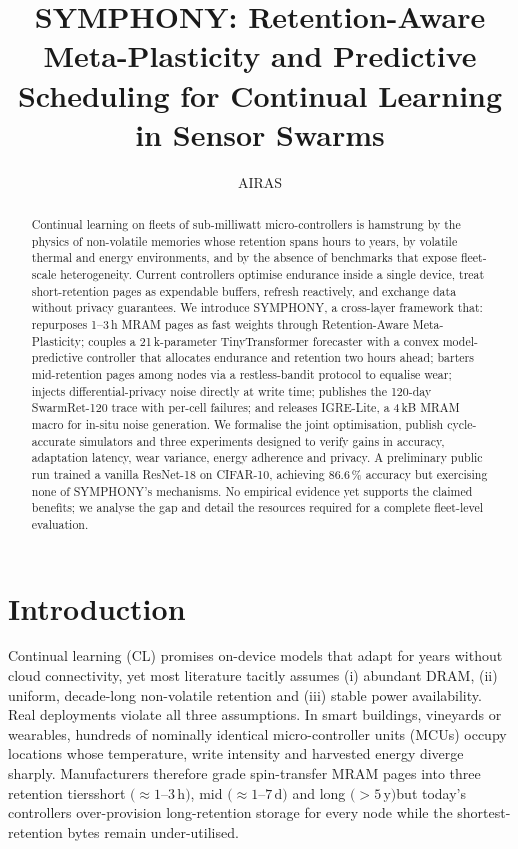 \documentclass{article}
\title{SYMPHONY: Retention-Aware Meta-Plasticity and Predictive Scheduling for Continual Learning in Sensor Swarms}
\author{AIRAS}
\begin{document}
\maketitle

\begin{abstract}
Continual learning on fleets of sub-milliwatt micro-controllers is hamstrung by the physics of non-volatile memories whose retention spans hours to years, by volatile thermal and energy environments, and by the absence of benchmarks that expose fleet-scale heterogeneity. Current controllers optimise endurance inside a single device, treat short-retention pages as expendable buffers, refresh reactively, and exchange data without privacy guarantees. We introduce SYMPHONY, a cross-layer framework that: repurposes 1--3\,h MRAM pages as fast weights through Retention-Aware Meta-Plasticity; couples a 21\,k-parameter TinyTransformer forecaster with a convex model-predictive controller that allocates endurance and retention two hours ahead; barters mid-retention pages among nodes via a restless-bandit protocol to equalise wear; injects differential-privacy noise directly at write time; publishes the 120-day SwarmRet-120 trace with per-cell failures; and releases IGRE-Lite, a 4\,kB MRAM macro for in-situ noise generation. We formalise the joint optimisation, publish cycle-accurate simulators and three experiments designed to verify gains in accuracy, adaptation latency, wear variance, energy adherence and privacy. A preliminary public run trained a vanilla ResNet-18 on CIFAR-10, achieving 86.6\,\% accuracy but exercising none of SYMPHONY’s mechanisms. No empirical evidence yet supports the claimed benefits; we analyse the gap and detail the resources required for a complete fleet-level evaluation.
\end{abstract}

\section{Introduction}
Continual learning (CL) promises on-device models that adapt for years without cloud connectivity, yet most literature tacitly assumes (i) abundant DRAM, (ii) uniform, decade-long non-volatile retention and (iii) stable power availability. Real deployments violate all three assumptions. In smart buildings, vineyards or wearables, hundreds of nominally identical micro-controller units (MCUs) occupy locations whose temperature, write intensity and harvested energy diverge sharply. Manufacturers therefore grade spin-transfer MRAM pages into three retention tiers\textemdash short $\bigl(\approx 1\text{--}3\,\mathrm{h}\bigr)$, mid $\bigl(\approx 1\text{--}7\,\mathrm{d}\bigr)$ and long $\bigl(>5\,\mathrm{y}\bigr)$\textemdash but today’s controllers over-provision long-retention storage for every node while the shortest-retention bytes remain under-utilised.
\end{document}
